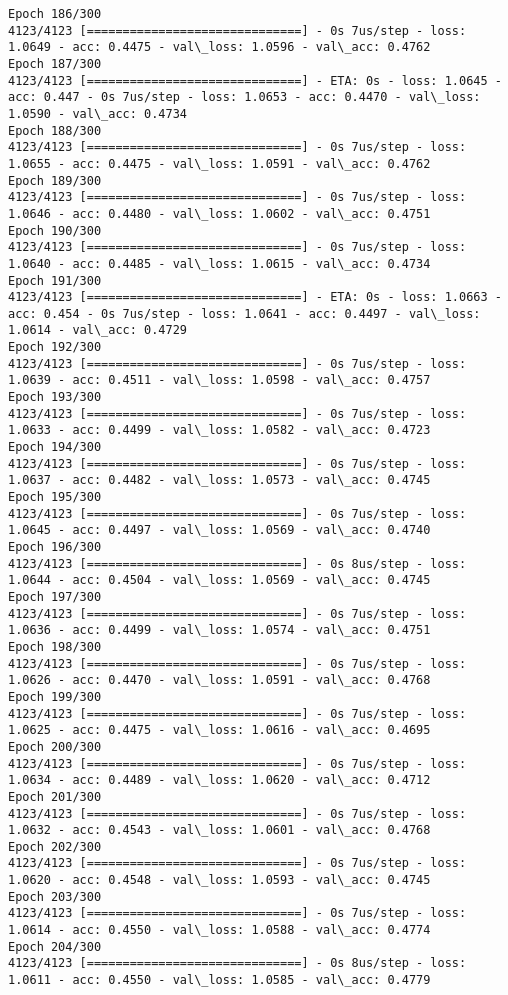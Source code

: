 \documentclass[11pt]{article}
\begin{document}
\begin{Verbatim}[commandchars=\\\{\}]
Epoch 186/300
4123/4123 [==============================] - 0s 7us/step - loss: 1.0649 - acc: 0.4475 - val\_loss: 1.0596 - val\_acc: 0.4762
Epoch 187/300
4123/4123 [==============================] - ETA: 0s - loss: 1.0645 - acc: 0.447 - 0s 7us/step - loss: 1.0653 - acc: 0.4470 - val\_loss: 1.0590 - val\_acc: 0.4734
Epoch 188/300
4123/4123 [==============================] - 0s 7us/step - loss: 1.0655 - acc: 0.4475 - val\_loss: 1.0591 - val\_acc: 0.4762
Epoch 189/300
4123/4123 [==============================] - 0s 7us/step - loss: 1.0646 - acc: 0.4480 - val\_loss: 1.0602 - val\_acc: 0.4751
Epoch 190/300
4123/4123 [==============================] - 0s 7us/step - loss: 1.0640 - acc: 0.4485 - val\_loss: 1.0615 - val\_acc: 0.4734
Epoch 191/300
4123/4123 [==============================] - ETA: 0s - loss: 1.0663 - acc: 0.454 - 0s 7us/step - loss: 1.0641 - acc: 0.4497 - val\_loss: 1.0614 - val\_acc: 0.4729
Epoch 192/300
4123/4123 [==============================] - 0s 7us/step - loss: 1.0639 - acc: 0.4511 - val\_loss: 1.0598 - val\_acc: 0.4757
Epoch 193/300
4123/4123 [==============================] - 0s 7us/step - loss: 1.0633 - acc: 0.4499 - val\_loss: 1.0582 - val\_acc: 0.4723
Epoch 194/300
4123/4123 [==============================] - 0s 7us/step - loss: 1.0637 - acc: 0.4482 - val\_loss: 1.0573 - val\_acc: 0.4745
Epoch 195/300
4123/4123 [==============================] - 0s 7us/step - loss: 1.0645 - acc: 0.4497 - val\_loss: 1.0569 - val\_acc: 0.4740
Epoch 196/300
4123/4123 [==============================] - 0s 8us/step - loss: 1.0644 - acc: 0.4504 - val\_loss: 1.0569 - val\_acc: 0.4745
Epoch 197/300
4123/4123 [==============================] - 0s 7us/step - loss: 1.0636 - acc: 0.4499 - val\_loss: 1.0574 - val\_acc: 0.4751
Epoch 198/300
4123/4123 [==============================] - 0s 7us/step - loss: 1.0626 - acc: 0.4470 - val\_loss: 1.0591 - val\_acc: 0.4768
Epoch 199/300
4123/4123 [==============================] - 0s 7us/step - loss: 1.0625 - acc: 0.4475 - val\_loss: 1.0616 - val\_acc: 0.4695
Epoch 200/300
4123/4123 [==============================] - 0s 7us/step - loss: 1.0634 - acc: 0.4489 - val\_loss: 1.0620 - val\_acc: 0.4712
Epoch 201/300
4123/4123 [==============================] - 0s 7us/step - loss: 1.0632 - acc: 0.4543 - val\_loss: 1.0601 - val\_acc: 0.4768
Epoch 202/300
4123/4123 [==============================] - 0s 7us/step - loss: 1.0620 - acc: 0.4548 - val\_loss: 1.0593 - val\_acc: 0.4745
Epoch 203/300
4123/4123 [==============================] - 0s 7us/step - loss: 1.0614 - acc: 0.4550 - val\_loss: 1.0588 - val\_acc: 0.4774
Epoch 204/300
4123/4123 [==============================] - 0s 8us/step - loss: 1.0611 - acc: 0.4550 - val\_loss: 1.0585 - val\_acc: 0.4779

\end{Verbatim}
\end{document}
